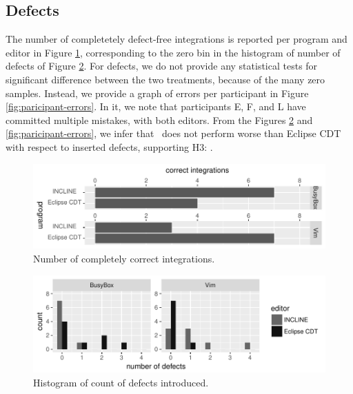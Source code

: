 \subsection{Defects}
The number of completetely defect-free integrations is reported per program and editor in Figure \ref{fig:correct-ans}, corresponding to the zero bin in the histogram of number of defects of Figure \ref{fig:defects-hist}. For defects, we do not provide any statistical tests for significant difference between the two treatments, because of the many zero samples. Instead, we provide a graph of errors per participant in Figure \ref{fig:paricipant-errors}. In it, we note that participants E, F, and L have committed multiple mistakes, with both editors. 
From the Figures \ref{fig:defects-hist} and \ref{fig:paricipant-errors}, we infer that \tooln~does not perform worse than Eclipse CDT with respect to inserted defects, supporting H3: \textit{\HC}.

\begin{figure}[ht]
    \centering
    \includegraphics{figure/incl-correct-ans-r.pdf}
    \caption{Number of completely correct integrations.}
    \label{fig:correct-ans}
\end{figure}

\begin{figure}[ht]
    \centering
    \includegraphics{figure/incl-correct-histo.pdf}
    \caption{Histogram of count of defects introduced.}
    \label{fig:defects-hist}
\end{figure}

